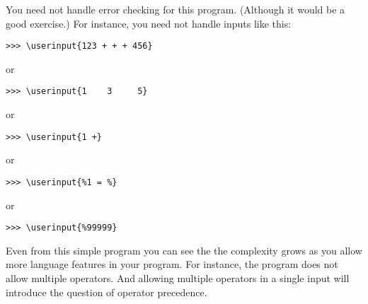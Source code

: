 You need not handle error checking for this program.
(Although it would be a good exercise.) For instance, you need not handle
inputs like this:
\begin{Verbatim}[frame=single, commandchars=\\\{\}]
>>> \userinput{123 + + + 456}
\end{Verbatim}
or
\begin{Verbatim}[frame=single, commandchars=\\\{\}]
>>> \userinput{1    3     5}
\end{Verbatim}
or
\begin{Verbatim}[frame=single, commandchars=\\\{\}]
>>> \userinput{1 +}
\end{Verbatim}
or
\begin{Verbatim}[frame=single, commandchars=\\\{\}]
>>> \userinput{%1 = %}
\end{Verbatim}
or
\begin{Verbatim}[frame=single, commandchars=\\\{\}]
>>> \userinput{%99999}
\end{Verbatim}

Even from this simple program you can see the the complexity grows as you
allow more language features in your program. For instance, the program does
not allow multiple operators. And allowing multiple operators in a single input will introduce the question
of operator precedence.
